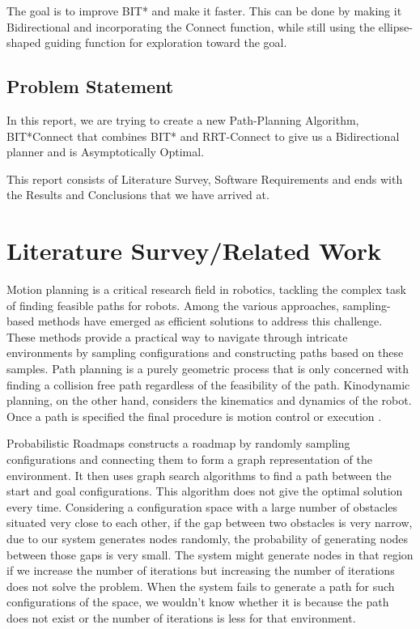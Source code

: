\documentclass[12pt]{report}
\begin{document}
The goal is to improve BIT* and make it faster. This can be done by making it Bidirectional and incorporating the Connect function, while still using the ellipse-shaped guiding function for exploration toward the goal.
\section{Problem Statement}
In this report, we are trying to create a new Path-Planning Algorithm, BIT*Connect that combines BIT* and RRT-Connect to give us a Bidirectional planner and is Asymptotically Optimal.


This report consists of Literature Survey, Software Requirements and ends with the Results and Conclusions that we have arrived at.


\chapter{Literature Survey/Related Work} 
Motion planning is a critical research field in robotics, tackling the complex task of finding feasible paths for robots. Among the various approaches, sampling-based methods have emerged as efficient solutions to address this challenge\cite{lavalle2006planning}. These methods provide a practical way to navigate through intricate environments by sampling configurations and constructing paths based on these samples. Path planning is a purely geometric process that is only concerned with finding a collision free path regardless of the feasibility of the path. Kinodynamic planning, on the other hand, considers the kinematics and dynamics of the robot. Once a path is specified the final procedure is motion control or execution \cite{6722915}.


Probabilistic Roadmaps \cite{508439} constructs a roadmap by randomly sampling configurations and connecting them to form a graph representation of the environment. It then uses graph search algorithms to find a path between the start and goal configurations. This algorithm does not give the optimal solution every time. Considering a configuration space with a large number of obstacles situated very close to each other, if the gap between two obstacles is very narrow, due to our system generates nodes randomly, the probability of generating nodes between those gaps is very small. The system might generate nodes in that region if we increase the number of iterations but increasing the number of iterations does not solve the problem.
When the system fails to generate a path for such configurations of the space, we wouldn’t know whether it is because the path does not exist or the number of iterations is less for that environment.
\end{document}
